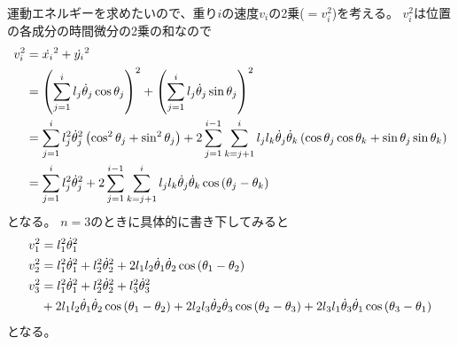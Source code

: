 \documentclass{jsarticle}
\newcommand{\eqa}[1]{\begin{align}#1\end{align}}
\newcommand{\cost}[2]{\cos\left(\theta_{#1}-\theta_{#2}\right)}
\newcommand{\dott}[1]{\dot{\theta}_{#1}}
\begin{document}
運動エネルギーを求めたいので、重り$i$の速度$v_i$の2乗($=v_i^2$)を考える。
$v_i^2$は位置の各成分の時間微分の2乗の和なので
\eqa{
	v_i^2 &= \dot{x_i}^2 + \dot{y_i}^2 \notag\\
		&= \left(\sum_{j=1}^i l_j \dott{j} \cos\theta_j\right)^2
			+ \left(\sum_{j=1}^i l_j \dott{j} \sin\theta_j\right)^2 \notag\\
		&= \sum_{j=1}^i l_j^2 \dott{j}^2 \left(\cos^2\theta_j + \sin^2\theta_j\right)
			+ 2\sum_{j=1}^{i-1} \sum_{k=j+1}^i l_j l_k \dott{j} \dott{k}
				\left(\cos\theta_j\cos\theta_k + \sin\theta_j\sin\theta_k\right) \notag\\
		&= \sum_{j=1}^i l_j^2 \dott{j}^2
			+ 2\sum_{j=1}^{i-1} \sum_{k=j+1}^i l_j l_k \dott{j} \dott{k} \cost{j}{k}
}
となる。
$n=3$のときに具体的に書き下してみると
\eqa{
	v_1^2 &= l_1^2 \dott{1}^2 \notag\\
	v_2^2 &= l_1^2 \dott{1}^2 + l_2^2 \dott{2}^2
		+ 2 l_1 l_2 \dott{1} \dott{2} \cos\left(\theta_1-\theta_2\right) \notag\\
	v_3^2 &= l_1^2 \dott{1}^2 + l_2^2 \dott{2}^2 + l_3^2 \dott{3}^2 \notag\\
		&+ 2 l_1 l_2 \dott{1} \dott{2} \cost{1}{2}
		+ 2 l_2 l_3 \dott{2} \dott{3} \cost{2}{3}
		+ 2 l_3 l_1 \dott{3} \dott{1} \cost{3}{1} \notag
}
となる。
\end{document}
